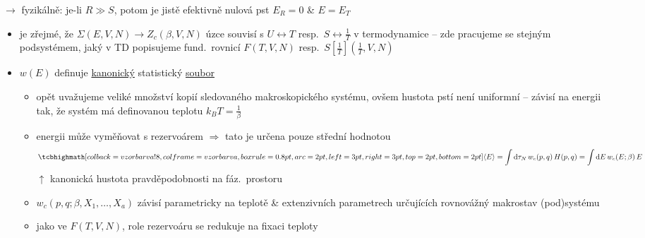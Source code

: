 \quad $\to$ fyzikálně: je-li $R\gg S$, potom je jistě efektivně nulová pst $E_R = 0$ \& $E = E_T$

\begin{center}
\end{center}

\begin{itemize}
  \item je zřejmé, že $\Sigma(E,V,N)\to Z_c(\beta,V,N)$ úzce souvisí s  $U\leftrightarrow T$ resp.\ $S\leftrightarrow\frac1T$ v termodynamice -- zde pracujeme se stejným podsystémem, jaký v TD popisujeme fund.\ rovnicí $F(T,V,N)$ resp.\ $S[\frac1T](\frac1T,V,N)$
  \item $w(E)$ definuje \underline{kanonický} statistický \underline{soubor}
  \begin{itemize}[label=$\to$]
    \item opět uvažujeme veliké množství kopií sledovaného makroskopického systému, ovšem hustota pstí není uniformní -- závisí na energii tak, že systém má definovanou teplotu $k_BT = \frac1\beta$
    \item energii může vyměňovat s rezervoárem $\Rightarrow$ tato je určena pouze střední hodnotou
    \[
      \vzorec{\langle E\rangle = \int\dd\tau_N\,w_c(p,q)\,H(p,q) = \int\dd E\,w_c(E;\beta)\,E}
    \]
    \hspace*{3.8cm}$\uparrow$ kanonická hustota pravděpodobnosti na fáz.\ prostoru
    \item $w_c(p,q;\beta,X_1,\dots,X_a)$ závisí parametricky na teplotě \& extenzivních parametrech určujících rovnovážný makrostav (pod)systému
    \item jako ve $F(T,V,N)$, role rezervoáru se redukuje na fixaci teploty
  \end{itemize}
\end{itemize}

